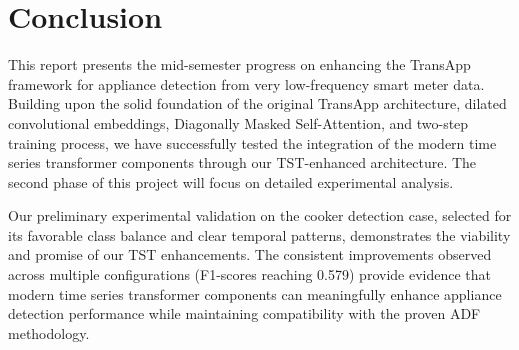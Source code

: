 \documentclass[conference]{IEEEtran}
\begin{document}
    

\section{Conclusion}
\label{sec:conclusion}

This report presents the mid-semester progress on enhancing the TransApp framework for appliance detection from very low-frequency smart meter data. Building upon the solid foundation of the original TransApp architecture, dilated convolutional embeddings, Diagonally Masked Self-Attention, and two-step training process, we have successfully tested the integration of the modern time series transformer components through our TST-enhanced architecture. The second phase of this project will focus on detailed experimental analysis. 

Our preliminary experimental validation on the cooker detection case, selected for its favorable class balance and clear temporal patterns, demonstrates the viability and promise of our TST enhancements. The consistent improvements observed across multiple configurations (F1-scores reaching 0.579) provide evidence that modern time series transformer components can meaningfully enhance appliance detection performance while maintaining compatibility with the proven ADF methodology.
\end{document}
